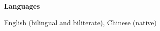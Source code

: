 \documentclass[11pt]{article}
\begin{document}

\begin{minipage}[t]{0.18\textwidth}
{\bf Languages}
\end{minipage}
\begin{minipage}[t]{0.8\textwidth}
English (bilingual and biliterate), Chinese (native)
\end{minipage} \newline\newline



\end{document}
